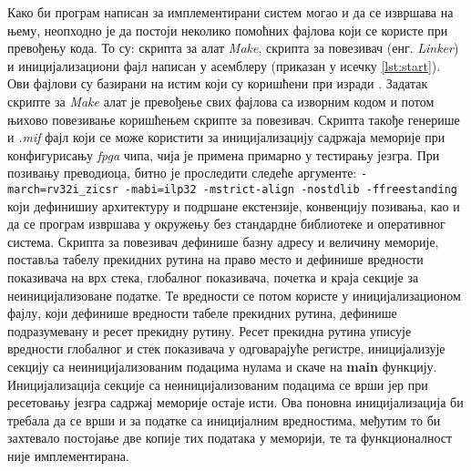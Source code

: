 Како би програм написан за имплементирани систем могао и да се извршава на њему, неопходно је да постоји неколико помоћних фајлова који се користе при превођењу кода. То су: скрипта за алат \textit{Make}, скрипта за повезивач (енг. \textit{Linker}) и иницијализациони фајл написан у асемблеру (приказан у исечку \ref{lst:start}). Ови фајлови су базирани на истим који су коришћени при изради \cite{arilla}. Задатак скрипте за \textit{Make} алат је превођење свих фајлова са изворним кодом и потом њихово повезивање коришћењем скрипте за повезивач. Скрипта такође генерише и \textit{.mif} фајл који се може користити за иницијализацију садржаја меморије при конфигурисању \textit{\acrshort{fpga}} чипа, чија је примена примарно у тестирању језгра. При позивању преводиоца, битно је проследити следеће аргументе: \lstinline[language=none,columns=fixed]{-march=rv32i_zicsr -mabi=ilp32 -mstrict-align -nostdlib -ffreestanding} који дефинишиу архитектуру и подршане екстензије, конвенцију позивања, као и да се програм извршава у окружењу без стандардне библиотеке и оперативног система. 
 Скрипта за повезивач дефинише базну адресу и величину меморије, поставља табелу прекидних рутина на право место и дефинише вредности показивача на врх стека, глобалног показивача, почетка и краја секције за неиницијализоване податке. Те вредности се потом користе у иницијализационом фајлу, који дефинише вредности табеле прекидних рутина, дефинише подразумевану и ресет прекидну рутину.
Ресет прекидна рутина уписује вредности глобалног и стек показивача у одговарајуће регистре, иницијализује секцију са неиницијализованим подацима нулама и скаче на \textbf{main} функцију.
Иницијализација секције са неиницијализованим подацима се врши јер при ресетовању језгра садржај меморије остаје исти. Ова поновна иницијализација би требала да се врши и за податке са иницијалним вредностима, међутим то би захтевало постојање две копије тих података у меморији, те та функционалност није имплементирана. 
